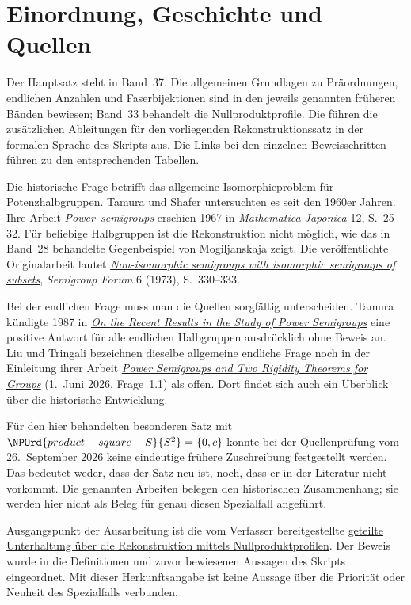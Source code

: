 \section*{Einordnung, Geschichte und Quellen}

Der Hauptsatz steht in Band~37. Die allgemeinen Grundlagen zu
Präordnungen, endlichen Anzahlen und Faserbijektionen sind in den
jeweils genannten früheren Bänden bewiesen; Band~33 behandelt
die Nullproduktprofile. Die \NullproductsProofsLink{} führen die
zusätzlichen Ableitungen für den vorliegenden Rekonstruktionssatz
in der formalen Sprache des Skripts aus.
Die Links bei den einzelnen Beweisschritten führen zu den
entsprechenden Tabellen.

Die historische Frage betrifft das allgemeine Isomorphieproblem für
Potenzhalbgruppen. Tamura und Shafer untersuchten es seit den 1960er
Jahren. Ihre Arbeit
\mbox{\emph{Power semigroups}} erschien 1967 in \emph{Mathematica Japonica}
12, S.~25--32. Für beliebige Halbgruppen ist die Rekonstruktion nicht
möglich, wie das in Band~28 behandelte Gegenbeispiel von Mogiljanskaja
zeigt. Die veröffentlichte Originalarbeit lautet
\href{https://doi.org/10.1007/BF02389140}
{\emph{Non-isomorphic semigroups with isomorphic semigroups of subsets}},
\emph{Semigroup Forum} 6 (1973), S.~330--333.

Bei der endlichen Frage muss man die Quellen sorgfältig unterscheiden.
Tamura kündigte 1987 in
\href{https://doi.org/10.1007/978-94-009-3839-7_22}
{\emph{On the Recent Results in the Study of Power Semigroups}}
eine positive Antwort für alle endlichen Halbgruppen ausdrücklich
ohne Beweis an. Liu und Tringali bezeichnen dieselbe allgemeine
endliche Frage noch in der Einleitung ihrer Arbeit
\href{https://arxiv.org/html/2606.01917v1}
{\emph{Power Semigroups and Two Rigidity Theorems for Groups}}
(1.~Juni 2026, Frage~1.1) als offen. Dort findet sich auch ein
Überblick über die historische Entwicklung.

Für den hier behandelten besonderen Satz mit \(\NPOrd{product-square-S}{S^2}=\{0,c\}\)
konnte bei der Quellenprüfung vom 26.~September 2026 keine eindeutige
frühere Zuschreibung festgestellt werden. Das bedeutet weder, dass
der Satz neu ist, noch, dass er in der Literatur nicht vorkommt.
Die genannten Arbeiten belegen den historischen Zusammenhang; sie
werden hier nicht als Beleg für genau diesen Spezialfall angeführt.

\par{}
Ausgangspunkt der Ausarbeitung ist die vom Verfasser bereitgestellte
\href{https://chatgpt.com/share/6ab6cc27-72d8-83ed-b081-c0255d3a43fe}
{geteilte Unterhaltung über die Rekonstruktion mittels Nullproduktprofilen}.
Der Beweis wurde in die Definitionen und zuvor bewiesenen Aussagen
des Skripts eingeordnet. Mit dieser Herkunftsangabe ist keine Aussage
über die Priorität oder Neuheit des Spezialfalls verbunden.

\noindent\NullproductsMainLink{}\enspace\textperiodcentered\enspace\NullproductsProofsLink{}

\par\smallskip\noindent\FiniteSemigroupsReadingLink{}
